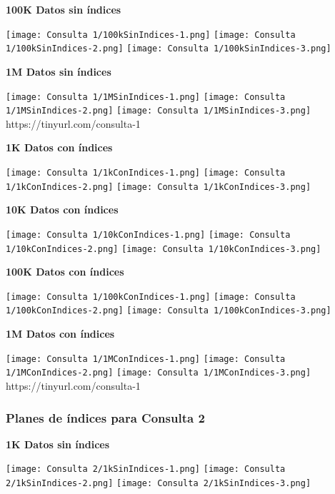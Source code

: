 \documentclass[12pt,a4paper]{article}
\begin{document}
\textbf{100K Datos sin índices}
\begin{center}
    \texttt{[image: Consulta 1/100kSinIndices-1.png]}
    \texttt{[image: Consulta 1/100kSinIndices-2.png]}
    \texttt{[image: Consulta 1/100kSinIndices-3.png]}
\end{center}

\textbf{1M Datos sin índices}
\begin{center}
    \texttt{[image: Consulta 1/1MSinIndices-1.png]}
    \texttt{[image: Consulta 1/1MSinIndices-2.png]}
    \texttt{[image: Consulta 1/1MSinIndices-3.png]}
    https://tinyurl.com/consulta-1
\end{center}

\textbf{1K Datos con índices}
\begin{center}
    \texttt{[image: Consulta 1/1kConIndices-1.png]}
    \texttt{[image: Consulta 1/1kConIndices-2.png]}
    \texttt{[image: Consulta 1/1kConIndices-3.png]}
\end{center}

\textbf{10K Datos con índices}
\begin{center}
    \texttt{[image: Consulta 1/10kConIndices-1.png]}
    \texttt{[image: Consulta 1/10kConIndices-2.png]}
    \texttt{[image: Consulta 1/10kConIndices-3.png]}
\end{center}

\textbf{100K Datos con índices}
\begin{center}
    \texttt{[image: Consulta 1/100kConIndices-1.png]}
    \texttt{[image: Consulta 1/100kConIndices-2.png]}
    \texttt{[image: Consulta 1/100kConIndices-3.png]}
\end{center}
\textbf{1M Datos con índices}
\begin{center}
    \texttt{[image: Consulta 1/1MConIndices-1.png]}
    \texttt{[image: Consulta 1/1MConIndices-2.png]}
    \texttt{[image: Consulta 1/1MConIndices-3.png]}
    https://tinyurl.com/consulta-1
\end{center}

\subsubsection{Planes de índices para Consulta 2}
\textbf{1K Datos sin índices}
\begin{center}
    \texttt{[image: Consulta 2/1kSinIndices-1.png]}
    \texttt{[image: Consulta 2/1kSinIndices-2.png]}
    \texttt{[image: Consulta 2/1kSinIndices-3.png]}
\end{center}
\end{document}
